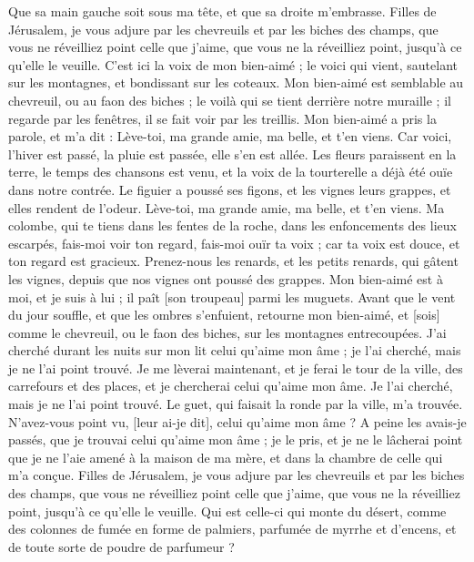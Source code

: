 \begin{multicols}{2}
Que sa main gauche soit sous ma tête, et que sa droite m'embrasse.
Filles de Jérusalem, je vous adjure par les chevreuils et par les biches des champs, que vous ne réveilliez point celle que j'aime, que vous ne la réveilliez point, jusqu'à ce qu'elle le veuille.
C'est ici la voix de mon bien-aimé ; le voici qui vient, sautelant sur les montagnes, et bondissant sur les coteaux.
Mon bien-aimé est semblable au chevreuil, ou au faon des biches ; le voilà qui se tient derrière notre muraille ; il regarde par les fenêtres, il se fait voir par les treillis.
Mon bien-aimé a pris la parole, et m'a dit : Lève-toi, ma grande amie, ma belle, et t'en viens.
Car voici, l'hiver est passé, la pluie est passée, elle s'en est allée.
Les fleurs paraissent en la terre, le temps des chansons est venu, et la voix de la tourterelle a déjà été ouïe dans notre contrée.
Le figuier a poussé ses figons, et les vignes leurs grappes, et elles rendent de l'odeur. Lève-toi, ma grande amie, ma belle, et t'en viens.
Ma colombe, qui te tiens dans les fentes de la roche, dans les enfoncements des lieux escarpés, fais-moi voir ton regard, fais-moi ouïr ta voix ; car ta voix est douce, et ton regard est gracieux.
Prenez-nous les renards, et les petits renards, qui gâtent les vignes, depuis que nos vignes ont poussé des grappes.
Mon bien-aimé est à moi, et je suis à lui ; il paît [son troupeau] parmi les muguets.
Avant que le vent du jour souffle, et que les ombres s'enfuient, retourne mon bien-aimé, et [sois] comme le chevreuil, ou le faon des biches, sur les montagnes entrecoupées.
\VerseOne{}J'ai cherché durant les nuits sur mon lit celui qu'aime mon âme ; je l'ai cherché, mais je ne l'ai point trouvé.
Je me lèverai maintenant, et je ferai le tour de la ville, des carrefours et des places, et je chercherai celui qu'aime mon âme. Je l'ai cherché, mais je ne l'ai point trouvé.
Le guet, qui faisait la ronde par la ville, m'a trouvée. N'avez-vous point vu, [leur ai-je dit], celui qu'aime mon âme ?
A peine les avais-je passés, que je trouvai celui qu'aime mon âme ; je le pris, et je ne le lâcherai point que je ne l'aie amené à la maison de ma mère, et dans la chambre de celle qui m'a conçue.
Filles de Jérusalem, je vous adjure par les chevreuils et par les biches des champs, que vous ne réveilliez point celle que j'aime, que vous ne la réveilliez point, jusqu'à ce qu'elle le veuille.
Qui est celle-ci qui monte du désert, comme des colonnes de fumée en forme de palmiers, parfumée de myrrhe et d'encens, et de toute sorte de poudre de parfumeur ?

\end{multicols}

